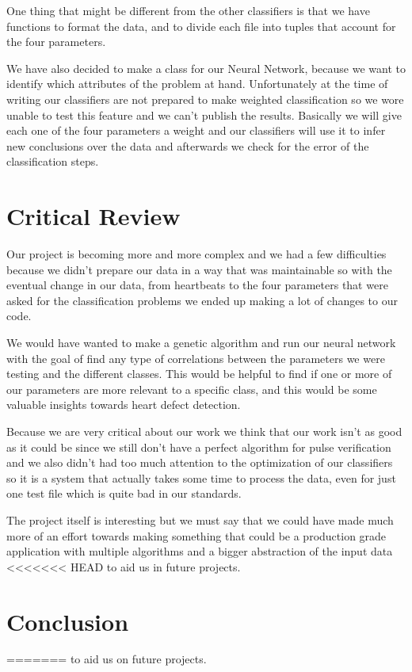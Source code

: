 \documentclass[conference]{IEEEtran}
\begin{document}
\begin{itemize}
\begin{itemize}
One thing that might be different from the other classifiers is that we have
functions to format the data, and to divide each file into tuples that account
for the four parameters.

We have also decided to make a class for our Neural Network, because we want to
identify which attributes of the problem at hand. Unfortunately at the time of
writing our classifiers are not prepared to make weighted classification so we
wore unable to test this feature and we can't publish the results.
Basically we will give each one of the four parameters a weight and our
classifiers will use it to infer new conclusions over the data and afterwards
we check for the error of the classification steps.

\section{Critical Review}
Our project is becoming more and more complex and we had a few difficulties
because we didn't prepare our data in a way that was maintainable so with the
eventual change in our data, from heartbeats to the four parameters that were
asked for the classification problems we ended up making a lot of changes to our
code.

We would have wanted to make a genetic algorithm and run our neural network with
the goal of find any type of correlations between the parameters we were testing
and the different classes. This would be helpful to find if one or more of our
parameters are more relevant to a specific class, and this would be some
valuable insights towards heart defect detection.

Because we are very critical about our work we think that our work isn't as
good as it could be since we still don't have a perfect algorithm for pulse
verification and we also didn't had too much attention to the optimization of
our classifiers so it is a system that actually takes some time to process the
data, even for just one test file which is quite bad in our standards.

The project itself is interesting but we must say that we could have made much
more of an effort towards making something that could be a production grade
application with multiple algorithms and a bigger abstraction of the input data
<<<<<<< HEAD
to aid us in future projects.

\section{Conclusion}
=======
to aid us on future projects.


\end{itemize}
\end{itemize}
\end{document}
